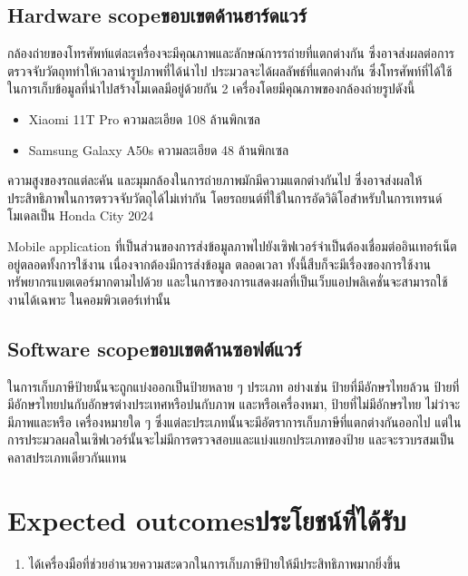 \subsection{\ifenglish Hardware scope\else ขอบเขตด้านฮาร์ดแวร์\fi}

กล้องถ่ายของโทรศัพท์แต่ละเครื่องจะมีคุณภาพและลักษณ์การรถ่ายที่แตกต่างกัน ซึ่งอาจส่งผลต่อการตรวจจับวัตถุททำให้เวลานำรูปภาพที่ได้นำไป
ประมวลจะได้ผลลัพธ์ที่แตกต่างกัน ซึ่งโทรศัพท์ที่ได้ใช้ในการเก็บข้อมูลที่นำไปสร้างโมเดลมีอยู่ด้วยกัน 2 เครื่องโดยมีคุณภาพของกล้องถ่ายรูปดังนี้
\begin{itemize}
    \item Xiaomi 11T Pro ความละเอียด 108 ล้านพิกเซล 
    \item Samsung Galaxy A50s ความละเอียด 48 ล้านพิกเซล 
\end{itemize}

ความสูงของรถแต่ละคัน และมุมกล้องในการถ่ายภาพมักมีความแตกต่างกันไป ซึ่งอาจส่งผลให้ประสิทธิภาพในการตรวจจับวัตถุได้ไม่เท่ากัน 
โดยรถยนต์ที่ใช้ในการอัดวิดิโอสำหรับในการเทรนด์โมเดลเป็น Honda City 2024 

Mobile application ที่เป็นส่วนของการส่งข้อมูลภาพไปยังเซิฟเวอร์จำเป็นต้องเชื่อมต่ออินเทอร์เน็ตอยู่ตลอดทั้งการใช้งาน เนื่องจากต้องมีการส่งข้อมูล
ตลอดเวลา ทั้งนี้สืบก็จะมีเรื่องของการใช้งานทรัพยากรแบตเตอร์มากตามไปด้วย และในการของการแสดงผลที่เป็นเว็บแอปพลิเคชั่นจะสามารถใช้งานได้เฉพาะ
ในคอมพิวเตอร์เท่านั้น 

\subsection{\ifenglish Software scope\else ขอบเขตด้านซอฟต์แวร์\fi}

ในการเก็บภาษีป้ายนั้นจะถูกแบ่งออกเป็นป้ายหลาย ๆ ประเภท อย่างเช่น ป้ายที่มีอักษรไทยล้วน ป้ายที่มีอักษรไทยปนกับอักษรต่างประเทศหรือปนกับภาพ 
และหรือเครื่องหมา, ป้ายที่ไม่มีอักษรไทย ไม่ว่าจะมีภาพและหรือ เครื่องหมายใด ๆ ซึ่งแต่ละประเภทนั้นจะมีอัตราการเก็บภาษีที่แตกต่างกันออกไป 
แต่ในการประมวลผลในเซิฟเวอร์นั้นจะไม่มีการตรวจสอบและแบ่งแยกประเภทของป้าย และจะรวบรสมเป็นคลาสประเภทเดียวกันแทน 

\section{\ifenglish Expected outcomes\else ประโยชน์ที่ได้รับ\fi}
\begin{enumerate}
    \item ได้เครื่องมือที่ช่วยอำนวยความสะดวกในการเก็บภาษีป้ายให้มีประสิทธิภาพมากยิ่งขึ้น
\end{enumerate}

